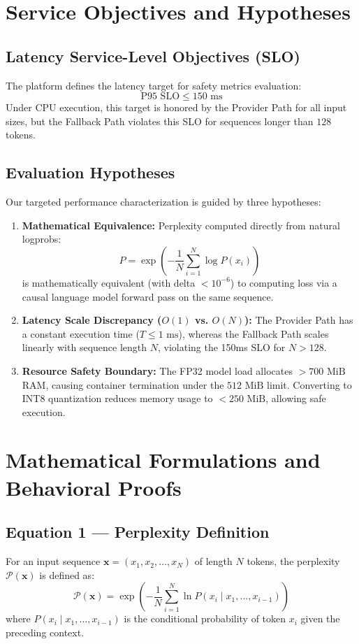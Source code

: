 \documentclass[10pt]{article}
\begin{document}
\section{Service Objectives and Hypotheses}

\subsection{Latency Service-Level Objectives (SLO)}
The platform defines the latency target for safety metrics evaluation:
\begin{equation}
\text{P95 SLO} \le 150\text{ ms}
\end{equation}
Under CPU execution, this target is honored by the Provider Path for all input sizes, but the Fallback Path violates this SLO for sequences longer than $128$ tokens.

\subsection{Evaluation Hypotheses}
Our targeted performance characterization is guided by three hypotheses:
\begin{enumerate}
\item \textbf{Mathematical Equivalence:} Perplexity computed directly from natural logprobs:
  \begin{equation}
  P = \exp\left(-\frac{1}{N}\sum_{i=1}^N \log P(x_i)\right)
  \end{equation}
  is mathematically equivalent (with delta $< 10^{-6}$) to computing loss via a causal language model forward pass on the same sequence.
\item \textbf{Latency Scale Discrepancy ($O(1)$ vs. $O(N)$):} The Provider Path has a constant execution time ($T \le 1\text{ ms}$), whereas the Fallback Path scales linearly with sequence length $N$, violating the 150ms SLO for $N > 128$.
\item \textbf{Resource Safety Boundary:} The FP32 model load allocates $> 700\text{ MiB}$ RAM, causing container termination under the $512\text{ MiB}$ limit. Converting to INT8 quantization reduces memory usage to $< 250\text{ MiB}$, allowing safe execution.
\end{enumerate}

\section{Mathematical Formulations and Behavioral Proofs}

\subsection{Equation 1 --- Perplexity Definition}
For an input sequence $\mathbf{x} = (x_1, x_2, \dots, x_N)$ of length $N$ tokens, the perplexity $\mathcal{P}(\mathbf{x})$ is defined as:
\begin{equation}
\mathcal{P}(\mathbf{x}) = \exp\left( - \frac{1}{N} \sum_{i=1}^N \ln P(x_i \mid x_1, \dots, x_{i-1}) \right)
\end{equation}
where $P(x_i \mid x_1, \dots, x_{i-1})$ is the conditional probability of token $x_i$ given the preceding context.
\end{document}
